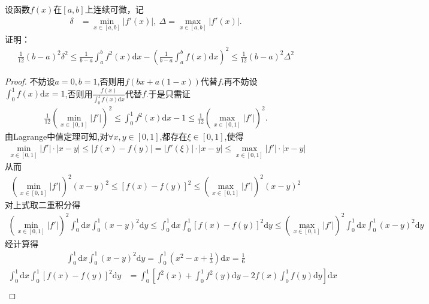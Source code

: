 \documentclass[../../main.tex]{subfiles}
\begin{document}
\begin{example}
设函数$f(x)$在$[a,b]$上连续可微，记
\begin{align*}
\delta &= \min_{x\in[a,b]} |f'(x)|, \ \Delta = \max_{x\in[a,b]} |f'(x)|.
\end{align*}
证明：
\begin{align*}
\frac{1}{12}(b - a)^2\delta^2 \leqslant \frac{1}{b - a}\int_a^b f^2(x)\mathrm{d}x - \left( \frac{1}{b - a}\int_a^b f(x)\mathrm{d}x \right)^2 \leqslant \frac{1}{12}(b - a)^2\Delta^2
\end{align*}
\end{example}
\begin{proof}
不妨设$a=0,b=1$,否则用$f(bx+a(1-x))$代替$f$.再不妨设$\int_0^1 f(x)\mathrm{d}x=1$,否则用$\frac{f(x)}{\int_0^1 f(x)\mathrm{d}x}$代替$f$.于是只需证
\begin{align*}
\frac{1}{12}\left( \min\limits_{x\in[0,1]} |f'| \right)^2 \leqslant \int_0^1 f^2(x)\mathrm{d}x - 1 \leqslant \frac{1}{12}\left( \max\limits_{x\in[0,1]} |f'| \right)^2.
\end{align*}
由Lagrange中值定理可知,对$\forall x,y\in[0,1]$,都存在$\xi\in[0,1]$,使得
\begin{align*}
\min\limits_{x\in[0,1]} |f'| \cdot |x - y| \leqslant |f(x) - f(y)| = |f'(\xi)| \cdot |x - y| \leqslant \max\limits_{x\in[0,1]} |f'| \cdot |x - y|
\end{align*}
从而
\begin{align*}
\left( \min\limits_{x\in[0,1]} |f'| \right)^2 (x - y)^2 \leqslant [f(x) - f(y)]^2 \leqslant \left( \max\limits_{x\in[0,1]} |f'| \right)^2 (x - y)^2
\end{align*}
对上式取二重积分得
\begin{align}
\left( \min\limits_{x\in[0,1]} |f'| \right)^2 \int_0^1 \mathrm{d}x \int_0^1 (x - y)^2 \mathrm{d}y \leqslant \int_0^1 \mathrm{d}x \int_0^1 [f(x) - f(y)]^2 \mathrm{d}y \leqslant \left( \max\limits_{x\in[0,1]} |f'| \right)^2 \int_0^1 \mathrm{d}x \int_0^1 (x - y)^2 \mathrm{d}y \label{eq:fwr3-vke9-kk34g4k::if9k2r321.1}
\end{align}
经计算得
\begin{align*}
\int_0^1 \mathrm{d}x \int_0^1 (x - y)^2 \mathrm{d}y = \int_0^1 \left( x^2 - x + \frac{1}{3} \right) \mathrm{d}x = \frac{1}{6}
\end{align*}
\begin{align*}
\int_0^1 \mathrm{d}x \int_0^1 [f(x) - f(y)]^2 \mathrm{d}y &= \int_0^1 \left[ f^2(x) + \int_0^1 f^2(y) \mathrm{d}y - 2f(x) \int_0^1 f(y) \mathrm{d}y \right] \mathrm{d}x \\

\end{align*}
\end{proof}
\end{document}
